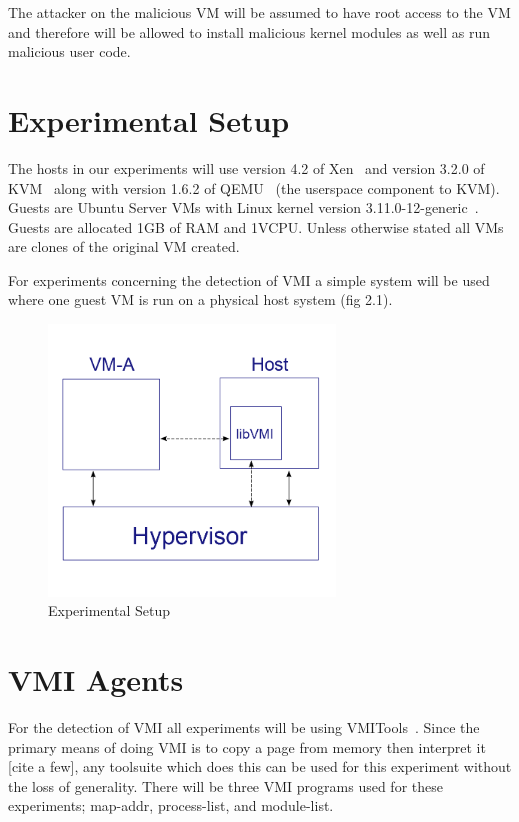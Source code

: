 	The attacker on the malicious VM will be assumed to have root access to the VM and therefore will be allowed to install malicious kernel modules as well as run malicious user code. 

\section{Experimental Setup}

	The hosts in our experiments will use version 4.2 of Xen~\cite{barham_xen_2003} and version 3.2.0 of KVM ~\cite{kivity_kvm:_2007}along with version 1.6.2 of QEMU~\cite{bellard_qemu_2005} (the userspace component to KVM). Guests are Ubuntu Server VMs with Linux kernel version 3.11.0-12-generic~\cite{_Linux_archive}. Guests are allocated 1GB of RAM and 1VCPU. Unless otherwise stated all VMs are clones of the original VM created. 

	For experiments concerning the detection of VMI a simple system will be used where one guest VM is run on a physical host system (fig 2.1). 

	\begin{figure}
	  \centering
	  \includegraphics[width=3in]{figures/BM_graph3_cropped.png}
	  \caption{Experimental Setup}
	\end{figure}

\section{VMI Agents}
For the detection of VMI all experiments will be using VMITools~\cite{payne_vmitools_2014}. Since the primary means of doing VMI is to copy a page from memory then interpret it [cite a few], any toolsuite which does this can be used for this experiment without the loss of generality. There will be three VMI programs used for these experiments; map-addr, process-list, and module-list. 

